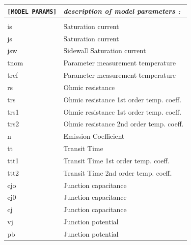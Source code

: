 \begin{longtable}{l l}		
\texttt{[MODEL PARAMS]} & \textit{description of model parameters :} \\ \hline \\ \vspace{-0.8\parskip}
																					{\small is} & {\small Saturation current} \\
																					{\small js} & {\small Saturation current} \\
																					{\small jsw} & {\small Sidewall Saturation current} \\
																					{\small tnom} & {\small Parameter measurement temperature} \\
																					{\small tref} & {\small Parameter measurement temperature} \\
																					{\small rs} & {\small Ohmic resistance} \\
																					{\small trs} & {\small Ohmic resistance 1st order temp. coeff.} \\
																					{\small trs1} & {\small Ohmic resistance 1st order temp. coeff.} \\
																					{\small trs2} & {\small Ohmic resistance 2nd order temp. coeff.} \\
																					{\small n} & {\small Emission Coefficient} \\
																					{\small tt} & {\small Transit Time} \\
																					{\small ttt1} & {\small Transit Time 1st order temp. coeff.} \\
																					{\small ttt2} & {\small Transit Time 2nd order temp. coeff.} \\
																					{\small cjo} & {\small Junction capacitance} \\
																					{\small cj0} & {\small Junction capacitance} \\
																					{\small cj} & {\small Junction capacitance} \\
																					{\small vj} & {\small Junction potential} \\
																					{\small pb} & {\small Junction potential} \\
																					

\end{longtable}
